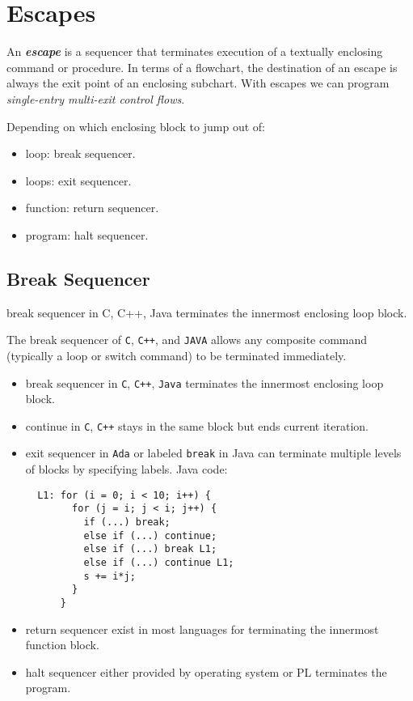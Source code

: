 \section{Escapes}
\label{sec:escapes}

An \textit{\textbf{escape}} is a sequencer that terminates execution of a textually enclosing command or procedure. In terms of a flowchart, the destination of an escape is always the exit point of an enclosing subchart. With escapes we can program \textit{single-entry multi-exit control flows}.

\noindent Depending on which enclosing block to jump out of:
\begin{itemize}
  \item loop: \textcolor{ex}{break} sequencer.
  \item loops: \textcolor{ex}{exit} sequencer.
  \item function: \textcolor{ex}{return} sequencer.
  \item program: \textcolor{ex}{halt} sequencer.
\end{itemize}

\subsection{Break Sequencer}
\label{subsec:break-seq}

break sequencer in C, C++, Java terminates the innermost
enclosing loop block.

The break sequencer of \texttt{C}, \texttt{C++}, and \texttt{JAVA} allows any composite command (typically a loop or switch command) to be terminated immediately.

\begin{itemize}
  \item \textcolor{ex}{break sequencer} in \texttt{C}, \texttt{C++}, \texttt{Java} terminates the innermost enclosing loop block.
  \item \textcolor{ex}{continue} in \texttt{C}, \texttt{C++} stays in the same block but ends current iteration.
  \item \textcolor{ex}{exit sequencer} in \texttt{Ada} or labeled \texttt{break} in Java can terminate multiple levels of blocks by specifying labels. Java code:
\begin{listing}[H]
\begin{verbatim}
  L1: for (i = 0; i < 10; i++) {
        for (j = i; j < i; j++) {
          if (...) break;
          else if (...) continue;
          else if (...) break L1;
          else if (...) continue L1;
          s += i*j;
        }
      }
\end{verbatim}
\caption{}
\label{code:code3}
\end{listing}     

  \item \textcolor{ex}{return sequencer} exist in most languages for terminating the innermost function block.
  \item \textcolor{ex}{halt sequencer} either provided by operating system or PL terminates the program.
\end{itemize}

